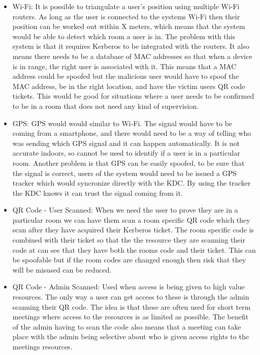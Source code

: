 \documentclass[]{report}   %
\begin{document}
\begin{itemize}

\item Wi-Fi: It is possible to triangulate a user’s position using multiple Wi-Fi routers. As long as the user is connected to the systems Wi-Fi then their position can be worked out within X meters, which means that the system would be able to detect which room a user is in. The problem with this system is that it requires Kerberos to be integrated with the routers. It also means there needs to be a database of MAC addresses so that when a device is in range, the right user is associated with it. This means that a MAC address could be spoofed but the malicious user would have to spoof the MAC address, be in the right location, and have the victim users QR code tickets. This would be good for situations where a user needs to be confirmed to be in a room that does not need any kind of supervision.

\item GPS: GPS would would similar to Wi-Fi. The signal would have to be coming from a smartphone, and there would need to be a way of telling who was sending which GPS signal and it can happen automatically. It is not accurate indoors, so cannot be used to identify if a user is in a particular room. Another problem is that GPS can be easily spoofed, to be sure that the signal is correct, users of the system would need to be issued a GPS tracker which would syncronize directly with the KDC. By using the tracker the KDC knows it can trust the signal coming from it.

\item QR Code - User Scanned: When we need the user to prove they are in a particular room we can have them scan a room specific QR code which they scan after they have acquired their Kerberos ticket. The room specific code is combined with their ticket so that the the resource they are scanning their code at can see that they have both the rooms code and their ticket. This can be spoofable but if the room codes are changed enough then risk that they will be misused can be reduced.

\item QR Code - Admin Scanned: Used when access is being given to high value resources. The only way a user can get access to these is through the admin scanning their QR code. The idea is that these are often used for short term meetings where access to the resources is as limited as possible. The benefit of the admin having to scan the code also means that a meeting can take place with the admin being selective about who is given access rights to the meetings resources.

\end{itemize}
\end{document}
